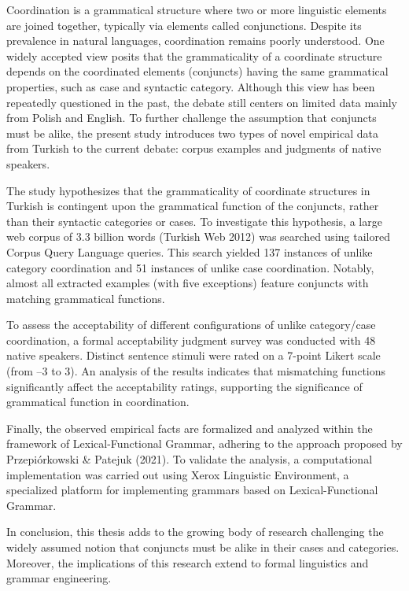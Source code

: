 \begin{sloppypar}
\begin{small}
Coordination is a grammatical structure where two or more linguistic elements are joined together, typically via elements called conjunctions. Despite its prevalence in natural languages, coordination remains poorly understood. One widely accepted view posits that the grammaticality of a coordinate structure depends on the coordinated elements (conjuncts) having the same grammatical properties, such as case and syntactic category. Although this view has been repeatedly questioned in the past, the debate still centers on limited data mainly from Polish and English. To further challenge the assumption that conjuncts must be alike, the present study introduces two types of novel empirical data from Turkish to the current debate: corpus examples and judgments of native speakers. 
	
The study hypothesizes that the grammaticality of coordinate structures in Turkish is contingent upon the grammatical function of the conjuncts, rather than their syntactic categories or cases. To investigate this hypothesis, a large web corpus of 3.3 billion words (Turkish Web 2012) was searched using tailored Corpus Query Language queries. This search yielded 137 instances of unlike category coordination and 51 instances of unlike case coordination. Notably, almost all extracted examples (with five exceptions) feature conjuncts with matching grammatical functions.
	
To assess the acceptability of different configurations of unlike category/case coordination, a formal acceptability judgment survey was conducted with 48 native speakers. Distinct sentence stimuli were rated on a 7-point Likert scale (from --3 to 3). An analysis of the results indicates that mismatching functions significantly affect the acceptability ratings, supporting the significance of grammatical function in coordination.
	
Finally, the observed empirical facts are formalized and analyzed within the framework of Lexical-Functional Grammar, adhering to the approach proposed by Przepiórkowski \& Patejuk (2021). To validate the analysis, a computational implementation was carried out using Xerox Linguistic Environment, a specialized platform for implementing grammars based on Lexical-Functional Grammar.
	
In conclusion, this thesis adds to the growing body of research challenging the widely assumed notion that conjuncts must be alike in their cases and categories. Moreover, the implications of this research extend to formal linguistics and grammar engineering.
\end{small}
\end{sloppypar}
